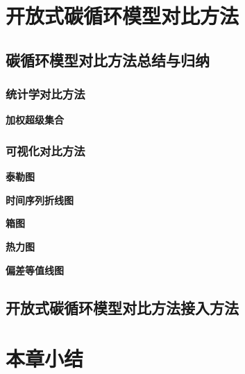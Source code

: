\section{开放式碳循环模型对比方法}

\subsection{碳循环模型对比方法总结与归纳}
\subsubsection{统计学对比方法}
\textbf{加权超级集合}

\subsubsection{可视化对比方法}
\textbf{泰勒图}

\textbf{时间序列折线图}

\textbf{箱图}

\textbf{热力图}

\textbf{偏差等值线图}

\subsection{开放式碳循环模型对比方法接入方法}

\section{本章小结}
